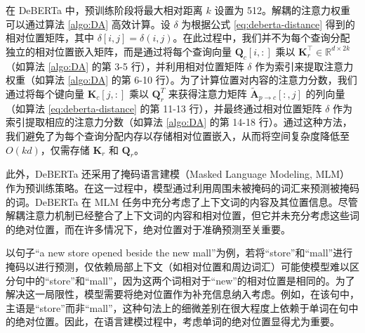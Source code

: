 在 DeBERTa 中，预训练阶段将最大相对距离 \(k\) 设置为 512。解耦的注意力权重可以通过算法 \ref{algo:DA} 高效计算。设 \(\delta\) 为根据公式 \ref{eq:deberta-distance} 得到的相对位置矩阵，其中 \(\delta[i, j] = \delta(i, j)\)。在此过程中，我们并不为每个查询分配独立的相对位置嵌入矩阵，而是通过将每个查询向量 \(\mathbf{Q}_{c}[i, :]\) 乘以 \(\mathbf{K}_{r}^{\intercal} \in \mathbb{R}^{d \times 2k}\)（如算法 \ref{algo:DA} 的第 3-5 行），并利用相对位置矩阵 \(\delta\) 作为索引来提取注意力权重（如算法 \ref{algo:DA} 的第 6-10 行）。为了计算位置对内容的注意力分数，我们通过将每个键向量 \(\mathbf{K}_{c}[j, :]\) 乘以 \(\mathbf{Q}_{r}^{T}\) 来获得注意力矩阵 \(\tilde{\mathbf{A}}_{p \to c}[:, j]\) 的列向量（如算法 \ref{eq:deberta-distance} 的第 11-13 行），并最终通过相对位置矩阵 \(\delta\) 作为索引提取相应的注意力分数（如算法 \ref{algo:DA} 的第 14-18 行）。通过这种方法，我们避免了为每个查询分配内存以存储相对位置嵌入，从而将空间复杂度降低至 \(O(kd)\)，仅需存储 \(\mathbf{K}_{r}\) 和 \(\mathbf{Q}_{r}\)。

此外，DeBERTa 还采用了掩码语言建模（Masked Language Modeling, MLM）作为预训练策略。在这一过程中，模型通过利用周围未被掩码的词汇来预测被掩码的词。DeBERTa 在 MLM 任务中充分考虑了上下文词的内容及其位置信息。尽管解耦注意力机制已经整合了上下文词的内容和相对位置，但它并未充分考虑这些词的绝对位置，而在许多情况下，绝对位置对于准确预测至关重要。

以句子“a new store opened beside the new mall”为例，若将“store”和“mall”进行掩码以进行预测，仅依赖局部上下文（如相对位置和周边词汇）可能使模型难以区分句中的“store”和“mall”，因为这两个词相对于“new”的相对位置是相同的。为了解决这一局限性，模型需要将绝对位置作为补充信息纳入考虑。例如，在该句中，主语是“store”而非“mall”，这种句法上的细微差别在很大程度上依赖于单词在句中的绝对位置。因此，在语言建模过程中，考虑单词的绝对位置显得尤为重要。

